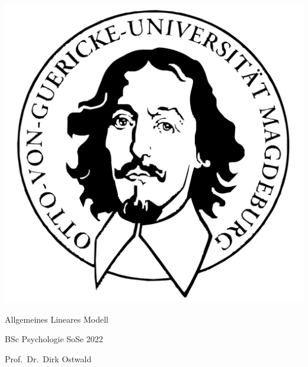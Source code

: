 \documentclass[
  8pt,
  ignorenonframetext,
]{beamer}
\author{}
\date{\vspace{-2.5em}}
\begin{document}
\begin{frame}[plain]{}
\protect\hypertarget{section}{}
\center

\begin{center}\includegraphics[width=0.2\linewidth]{11_Abbildungen/alm_11_otto} \end{center}

\vspace{2mm}

\huge

Allgemeines Lineares Modell \vspace{6mm}

\large

BSc Psychologie SoSe 2022

\vspace{6mm}
\normalsize

Prof.~Dr.~Dirk Ostwald
\end{frame}
\end{document}
